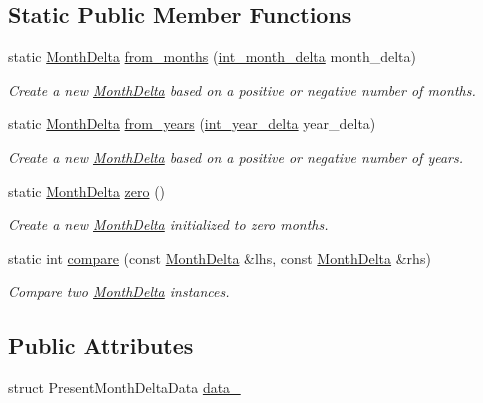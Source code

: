 \subsection*{Static Public Member Functions}
\begin{DoxyCompactItemize}
\item 
static \hyperlink{structMonthDelta}{Month\-Delta} \hyperlink{structMonthDelta_afc96dd6ca914abc1ddd067f8f3755a89}{from\-\_\-months} (\hyperlink{types_8h_adc711c00c117528b40875ad0119c687f}{int\-\_\-month\-\_\-delta} month\-\_\-delta)
\begin{DoxyCompactList}\small\item\em Create a new \hyperlink{structMonthDelta}{Month\-Delta} based on a positive or negative number of months. \end{DoxyCompactList}\item 
static \hyperlink{structMonthDelta}{Month\-Delta} \hyperlink{structMonthDelta_a02632b6ef33850d9329bd04a686ce1ed}{from\-\_\-years} (\hyperlink{types_8h_ad2a6eecbd190f1ae0327acdeaf596623}{int\-\_\-year\-\_\-delta} year\-\_\-delta)
\begin{DoxyCompactList}\small\item\em Create a new \hyperlink{structMonthDelta}{Month\-Delta} based on a positive or negative number of years. \end{DoxyCompactList}\item 
static \hyperlink{structMonthDelta}{Month\-Delta} \hyperlink{structMonthDelta_a847cb9c956c133957dbaffb32fb9bd15}{zero} ()
\begin{DoxyCompactList}\small\item\em Create a new \hyperlink{structMonthDelta}{Month\-Delta} initialized to zero months. \end{DoxyCompactList}\item 
static int \hyperlink{structMonthDelta_afb632f08f6278bcf7dfd5aef0cb12322}{compare} (const \hyperlink{structMonthDelta}{Month\-Delta} \&lhs, const \hyperlink{structMonthDelta}{Month\-Delta} \&rhs)
\begin{DoxyCompactList}\small\item\em Compare two \hyperlink{structMonthDelta}{Month\-Delta} instances. \end{DoxyCompactList}\end{DoxyCompactItemize}
\subsection*{Public Attributes}
\begin{DoxyCompactItemize}
\item 
struct Present\-Month\-Delta\-Data \hyperlink{structMonthDelta_a428f2591ca57d192424b298f95c87978}{data\-\_\-}
\end{DoxyCompactItemize}
